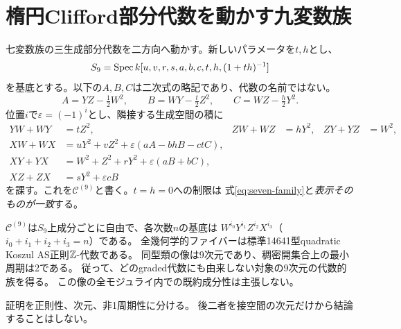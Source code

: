 \section{楕円Clifford部分代数を動かす九変数族}\label{sec:elliptic-ore}
七変数族の三生成部分代数を二方向へ動かす。新しいパラメータを$t,h$とし、
\[
 S_9=\operatorname{Spec} k[u,v,r,s,a,b,c,t,h,(1+th)^{-1}]
\]
を基底とする。以下の$A,B,C$は二次式の略記であり、代数の名前ではない。
\begin{equation}\label{eq:nine-quadratics}
 A=YZ-\tfrac12W^2,\qquad B=WY-\tfrac t2Z^2,\qquad C=WZ-\tfrac h2Y^2.
\end{equation}
位置$i$で$\varepsilon=(-1)^i$とし、隣接する生成空間の積に
\begin{equation}\label{eq:nine-family}
\begin{aligned}
 YW+WY&=tZ^2,& ZW+WZ&=hY^2,& ZY+YZ&=W^2,\\
 XW+WX&=uY^2+vZ^2+\varepsilon(aA-bhB-ctC),\\
 XY+YX&=W^2+Z^2+rY^2+\varepsilon(aB+bC),\\
 XZ+ZX&=sY^2+\varepsilon cB
\end{aligned}
\end{equation}
を課す。これを$\mathcal C^{(9)}$と書く。$t=h=0$への制限は
式\eqref{eq:seven-family}と\emph{表示そのものが一致}する。

\begin{theorem}[九変数の代数的拡張]\label{thm:algebraic-nine}
$\mathcal C^{(9)}$は$S_9$上成分ごとに自由で、各次数$n$の基底は
$W^{i_0}Y^{i_1}Z^{i_2}X^{i_3}$（$i_0+i_1+i_2+i_3=n$）である。
全幾何学的ファイバーは標準14641型quadratic Koszul AS正則$\mathbb Z$-代数である。
同型類の像は9次元であり、稠密開集合上の最小周期は2である。
従って、どのgraded代数にも由来しない対象の9次元の代数的族を得る。
この像の全モジュライ内での既約成分性は主張しない。
\end{theorem}
証明を正則性、次元、非1周期性に分ける。
後二者を接空間の次元だけから結論することはしない。

